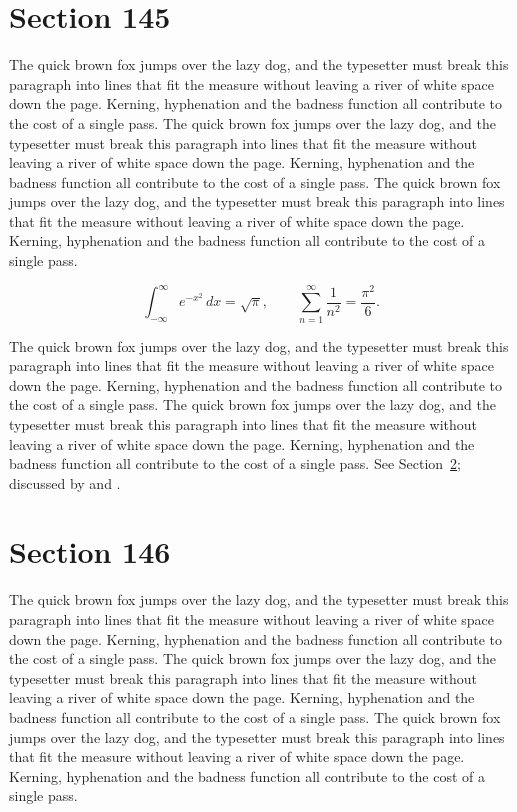 \documentclass{article}
\begin{document}
\section{Section 145}
\label{sec:145}
The quick brown fox jumps over the lazy dog, and the typesetter must break this paragraph into lines that fit the measure without leaving a river of white space down the page. Kerning, hyphenation and the badness function all contribute to the cost of a single pass. The quick brown fox jumps over the lazy dog, and the typesetter must break this paragraph into lines that fit the measure without leaving a river of white space down the page. Kerning, hyphenation and the badness function all contribute to the cost of a single pass. The quick brown fox jumps over the lazy dog, and the typesetter must break this paragraph into lines that fit the measure without leaving a river of white space down the page. Kerning, hyphenation and the badness function all contribute to the cost of a single pass. 

\begin{equation}\label{eq:145}
\int_{-\infty}^{\infty} e^{-x^{2}}\,dx = \sqrt{\pi}, \qquad
\sum_{n=1}^{\infty} \frac{1}{n^{2}} = \frac{\pi^{2}}{6}.
\end{equation}

The quick brown fox jumps over the lazy dog, and the typesetter must break this paragraph into lines that fit the measure without leaving a river of white space down the page. Kerning, hyphenation and the badness function all contribute to the cost of a single pass. The quick brown fox jumps over the lazy dog, and the typesetter must break this paragraph into lines that fit the measure without leaving a river of white space down the page. Kerning, hyphenation and the badness function all contribute to the cost of a single pass. 
See Section~\ref{sec:146}; discussed by \textcite{k1} and \textcite{l3}.
\section{Section 146}
\label{sec:146}
The quick brown fox jumps over the lazy dog, and the typesetter must break this paragraph into lines that fit the measure without leaving a river of white space down the page. Kerning, hyphenation and the badness function all contribute to the cost of a single pass. The quick brown fox jumps over the lazy dog, and the typesetter must break this paragraph into lines that fit the measure without leaving a river of white space down the page. Kerning, hyphenation and the badness function all contribute to the cost of a single pass. The quick brown fox jumps over the lazy dog, and the typesetter must break this paragraph into lines that fit the measure without leaving a river of white space down the page. Kerning, hyphenation and the badness function all contribute to the cost of a single pass. 
\end{document}
